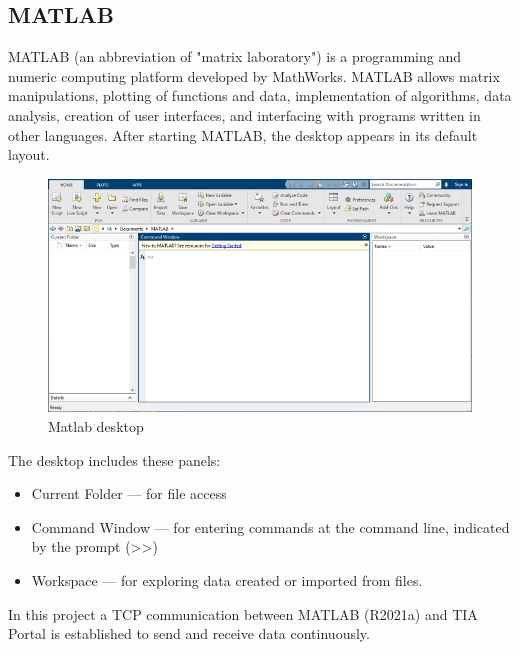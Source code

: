 \subsection{MATLAB}
MATLAB (an abbreviation of "matrix laboratory") is a programming and numeric computing platform developed by MathWorks. MATLAB allows matrix manipulations, plotting of functions and data, implementation of algorithms, data analysis, creation of user interfaces, and interfacing with programs written in other languages.
After starting MATLAB, the desktop appears in its default layout.
\begin{figure}[!h]
\begin{center}
\includegraphics[width=0.6\linewidth]{capitolo2/figure/matlab_desktop.png}
\caption{Matlab desktop}
\end{center}
\label{fig:matlab_desktop}
\end{figure}


The desktop includes these panels:
\begin{itemize}
    \item Current Folder — for file access
    \item Command Window — for entering commands at the command line, indicated by the prompt (>>)
    \item Workspace — for exploring data created or imported from files. \cite{MATLABDo23:online}
\end{itemize} 
In this project a TCP communication between MATLAB (R2021a) and TIA Portal is established to send and receive data continuously. 

